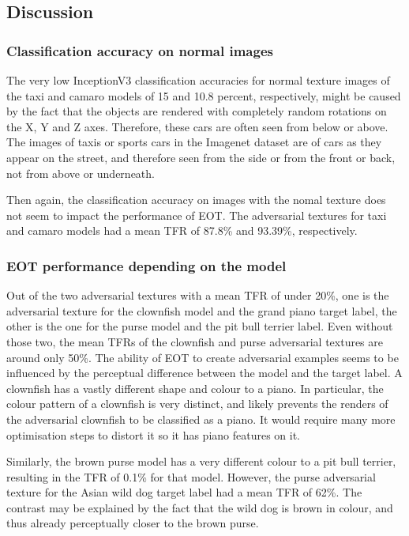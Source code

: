 \newpage
\subsection{Discussion}

\subsubsection{Classification accuracy on normal images}

The very low InceptionV3 classification accuracies for normal texture images of the taxi and camaro models of 15 and 10.8 percent, respectively, might be caused by the fact that the objects are rendered with completely random rotations on the X, Y and Z axes. Therefore, these cars are often seen from below or above. The images of taxis or sports cars in the Imagenet dataset are of cars as they appear on the street, and therefore seen from the side or from the front or back, not from above or underneath.

Then again, the classification accuracy on images with the nomal texture does not seem to impact the performance of EOT. The adversarial textures for taxi and camaro models had a mean TFR of 87.8\% and 93.39\%, respectively.

\subsubsection{EOT performance depending on the model}

Out of the two adversarial textures with a mean TFR of under 20\%, one is the adversarial texture for the clownfish model and the grand piano target label, the other is the one for the purse model and the pit bull terrier label. Even without those two, the mean TFRs of the clownfish and purse adversarial textures are around only 50\%. The ability of EOT to create adversarial examples seems to be influenced by the perceptual difference between the model and the target label. A clownfish has a vastly different shape and colour to a piano. In particular, the colour pattern of a clownfish is very distinct, and likely prevents the renders of the adversarial clownfish to be classified as a piano. It would require many more optimisation steps to distort it so it has piano features on it.

Similarly, the brown purse model has a very different colour to a pit bull terrier, resulting in the TFR of 0.1\% for that model. However, the purse adversarial texture for the Asian wild dog target label had a mean TFR of 62\%. The contrast may be explained by the fact that the wild dog is brown in colour, and thus already perceptually closer to the brown purse.

